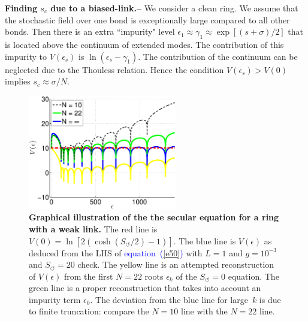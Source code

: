\documentclass[aps,pre,floats,floatfix,twocolumn]{revtex4}
\newcommand{\Eq}[1]{\textcolor{blue}{{equation}\!~(\ref{#1})}}
\newcommand{\sect}[1]{{\bf #1.-- }}
\begin{document}
\sect{Finding $s_c$ due to a biased-link}
%
We consider a clean ring. We assume that the stochastic field 
over one bond is exceptionally large compared to all other bonds.   
Then there is an extra ``impurity" level  
${\epsilon_1 \approx \gamma_1 \approx \exp[(s+\sigma)/2]}$ 
that is located above the continuum of extended modes. 
The contribution of this impurity to $V(\epsilon_s)$ 
is $\ln(\epsilon_s-\gamma_1)$. 
The contribution of the continuum can be neglected 
due to the Thouless relation. 
Hence the condition ${V(\epsilon_s)>V(0)}$ 
implies $s_c \approx \sigma/N$. 
\\     



\begin{figure}

\includegraphics[height=5cm]{gRing_ES_vs_cont}

\caption{\label{figReconstruction} 
{\bf Graphical illustration of the the secular equation for a ring with a weak link.} 
The red line is $V(0)=\ln[2(\cosh(S_{\circlearrowleft}/2)-1)]$. 
The blue line is $V(\epsilon)$ as deduced from the LHS of \Eq{e50}
with ${L=1}$ and ${g=10^{-3}}$ and {${S_{\circlearrowleft}=20}$ check}.
The yellow line is an attempted reconstruction of $V(\epsilon)$ 
from the first $N=22$ roots $\epsilon_k$ of the $S_{\circlearrowleft}{=}0$ equation. 
The green line is a proper reconstruction that takes into account 
an impurity term $\epsilon_0$. The deviation from the blue line 
for large~$k$ is due to finite truncation: compare the ${N{=}10}$ line with the ${N{=}22}$ line. 
}
\end{figure}
\end{document}
